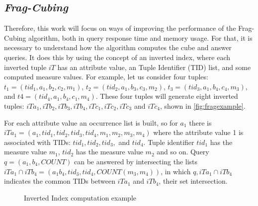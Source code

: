 \subsection{\textit{Frag-Cubing}}\label{ch:corr:cube:frag}

Therefore, this work will focus on ways of improving the performance of the Frag-Cubing algorithm, both in query response time and memory usage.
For that, it is necessary to understand how the algorithm computes the cube and answer queries.
It does this by using the concept of an inverted index, where each inverted tuple $iT$ has an attribute value, an Tuple Identifier (TID) list, and some computed measure values.
For example, let us consider four tuples: $t_1 = (tid_1, a_1, b_2, c_2, m_1)$, $t_2 = (tid_2, a_1, b_3, c_3, m_2)$, $t_3 = (tid_3, a_1, b_4, c_4, m_3)$, and $t4 = (tid_4, a_1, b_4, c_1, m_4)$.
These four tuples will generate eight inverted tuples: $iTa_1, iTb_2, iTb_3, iTb_4, iTc_1, iTc_2, iTc_3$ and $iTc_4$, shown in \autoref{fig:fragexample}.

For each attribute value an occurrence list is built, so for $a_1$ there is $iTa_1 = (a_1, tid_1, tid_2, tid_3, tid_4, m_1, m_2, m_3, m_4)$ where the attribute value 1 is associated with TIDs: $tid_1, tid_2, tid_3,$ and $tid_4$.
Tuple identifier $tid_1$ has the measure value $m_1$, $tid_2$ has the measure value $m_2$ and so on.
Query $q = (a_1, b_4, COUNT)$ can be answered by intersecting the lists $iTa_1 \cap iTb_4 = (a_1b_4, tid_3, tid_4, COUNT(m_3, m_4))$, in which $q, iTa_1 \cap iTb_4$ indicates the common TIDs between $iTa_1$ and $iTb_4$, their set intersection.

\begin{figure}[!htb]
  \caption{Inverted Index computation example}\label{fig:fragexample}
  \vspace{2mm}
  \begin{center}
  \end{center}
  \vspace{1mm}
  \legenda{}
\end{figure}

